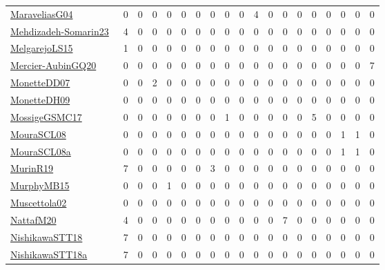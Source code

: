 {\begin{longtable}{l*{18}{r}}
\href{papers/MaraveliasG04.pdf}{MaraveliasG04}~\cite{MaraveliasG04} & 0 & 0 & 0 & 0 & 0 & 0 & 0 & 0 & 0 & 4 & 0 & 0 & 0 & 0 & 0 & 0 & 0 & 0\\
\href{papers/Mehdizadeh-Somarin23.pdf}{Mehdizadeh-Somarin23}~\cite{Mehdizadeh-Somarin23} & 4 & 0 & 0 & 0 & 0 & 0 & 0 & 0 & 0 & 0 & 0 & 0 & 0 & 0 & 0 & 0 & 0 & 0\\
\href{papers/MelgarejoLS15.pdf}{MelgarejoLS15}~\cite{MelgarejoLS15} & 1 & 0 & 0 & 0 & 0 & 0 & 0 & 0 & 0 & 0 & 0 & 0 & 0 & 0 & 0 & 0 & 0 & 0\\
\href{papers/Mercier-AubinGQ20.pdf}{Mercier-AubinGQ20}~\cite{Mercier-AubinGQ20} & 0 & 0 & 0 & 0 & 0 & 0 & 0 & 0 & 0 & 0 & 0 & 0 & 0 & 0 & 0 & 0 & 0 & 7\\
\href{papers/MonetteDD07.pdf}{MonetteDD07}~\cite{MonetteDD07} & 0 & 0 & 2 & 0 & 0 & 0 & 0 & 0 & 0 & 0 & 0 & 0 & 0 & 0 & 0 & 0 & 0 & 0\\
\href{papers/MonetteDH09.pdf}{MonetteDH09}~\cite{MonetteDH09} & 0 & 0 & 0 & 0 & 0 & 0 & 0 & 0 & 0 & 0 & 0 & 0 & 0 & 0 & 0 & 0 & 0 & 0\\
\href{papers/MossigeGSMC17.pdf}{MossigeGSMC17}~\cite{MossigeGSMC17} & 0 & 0 & 0 & 0 & 0 & 0 & 0 & 1 & 0 & 0 & 0 & 0 & 0 & 5 & 0 & 0 & 0 & 0\\
\href{papers/MouraSCL08.pdf}{MouraSCL08}~\cite{MouraSCL08} & 0 & 0 & 0 & 0 & 0 & 0 & 0 & 0 & 0 & 0 & 0 & 0 & 0 & 0 & 0 & 1 & 1 & 0\\
\href{papers/MouraSCL08a.pdf}{MouraSCL08a}~\cite{MouraSCL08a} & 0 & 0 & 0 & 0 & 0 & 0 & 0 & 0 & 0 & 0 & 0 & 0 & 0 & 0 & 0 & 1 & 1 & 0\\
\href{papers/MurinR19.pdf}{MurinR19}~\cite{MurinR19} & 7 & 0 & 0 & 0 & 0 & 0 & 3 & 0 & 0 & 0 & 0 & 0 & 0 & 0 & 0 & 0 & 0 & 0\\
\href{papers/MurphyMB15.pdf}{MurphyMB15}~\cite{MurphyMB15} & 0 & 0 & 0 & 1 & 0 & 0 & 0 & 0 & 0 & 0 & 0 & 0 & 0 & 0 & 0 & 0 & 0 & 0\\
\href{papers/Muscettola02.pdf}{Muscettola02}~\cite{Muscettola02} & 0 & 0 & 0 & 0 & 0 & 0 & 0 & 0 & 0 & 0 & 0 & 0 & 0 & 0 & 0 & 0 & 0 & 0\\
\href{papers/NattafM20.pdf}{NattafM20}~\cite{NattafM20} & 4 & 0 & 0 & 0 & 0 & 0 & 0 & 0 & 0 & 0 & 0 & 7 & 0 & 0 & 0 & 0 & 0 & 0\\
\href{papers/NishikawaSTT18.pdf}{NishikawaSTT18}~\cite{NishikawaSTT18} & 7 & 0 & 0 & 0 & 0 & 0 & 0 & 0 & 0 & 0 & 0 & 0 & 0 & 0 & 0 & 0 & 0 & 0\\
\href{papers/NishikawaSTT18a.pdf}{NishikawaSTT18a}~\cite{NishikawaSTT18a} & 7 & 0 & 0 & 0 & 0 & 0 & 0 & 0 & 0 & 0 & 0 & 0 & 0 & 0 & 0 & 0 & 0 & 0\\

\end{longtable}}
